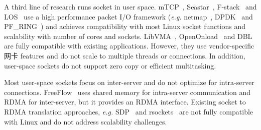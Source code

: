 A third line of research runs socket in user space.
mTCP~\cite{jeong2014mtcp}, Seastar~\cite{seastar}, 
F-stack~\cite{fstack} and LOS~\cite{huang2017high} use a high performance packet I/O framework (\textit{e.g.} netmap~\cite{rizzo2012netmap}, DPDK~\cite{dpdk} and PF\_RING~\cite{pf-ring}) and achieves compatibility with most Linux socket functions and scalability with number of cores and sockets.
LibVMA~\cite{libvma}, OpenOnload~\cite{openonload} and DBL~\cite{dbl} are fully compatible with existing applications. However, they use vendor-specific 网卡 features and do not scale to multiple threads or connections.
In addition, user-space sockets do not support zero copy or efficient multitasking.

Most user-space sockets focus on inter-server and do not optimize for intra-server connections.
FreeFlow~\cite{freeflow} uses shared memory for intra-server communication and RDMA for inter-server, but it provides an RDMA interface.
Existing socket to RDMA translation approaches, \textit{e.g.} SDP~\cite{socketsdirect} and rsockets~\cite{rsockets} are not fully compatible with Linux and do not address scalability challenges.


\fi


